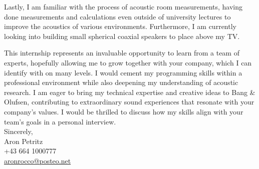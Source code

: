 \documentclass[12pt]{article}
\begin{document}
Lastly, I am familiar with the process of acoustic room measurements, having done measurements and calculations even outside of university lectures to improve the acoustics of various environments. Furthermore, I am currently looking into building small spherical coaxial speakers to place above my TV.

This internship represents an invaluable opportunity to learn from a team of experts, hopefully allowing me to grow together with your company, which I can identify with on many levels. I would cement my programming skills within a professional environment while also deepening my understanding of acoustic research.
I am eager to bring my technical expertise and creative ideas to Bang \& Olufsen, contributing to extraordinary sound experiences that resonate with your company’s values. I would be thrilled to discuss how my skills align with your team’s goals in a personal interview.
\vspace{1em}\\
\noindent Sincerely,\\
Aron Petritz
\vspace{0.5em}\\
+43 664 1000777\\
\href{aronrocco@posteo.net}{aronrocco@posteo.net}
\end{document}
